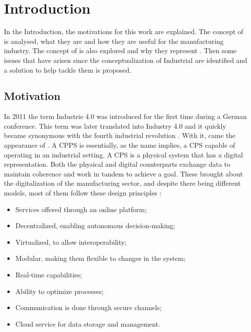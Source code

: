 


\chapter{Introduction}
\label{cha:introduction}

In the Introduction, the motivations for this work are explained. The concept of  is analysed, what they are and how they are useful for the manufacturing industry. The concept of  is also explored and why they represent . Then some issues that have arisen since the conceptualization of Industrial  are identified and a solution to help tackle them is proposed.

\section{Motivation}
\label{sec:motivation}

In 2011 the term Industrie 4.0 was introduced for the first time during a German conference. This term was later translated into Industry 4.0 and it quickly became synonymous with the fourth industrial revolution \cite{birgit01}. With it, came the appearance of . A \acrshort{CPPS} is essentially, as the name implies, a \acrfull{CPS} capable of operating in an industrial setting. A \acrshort{CPS} is a physical system that has a digital representation. Both the physical and digital counterparts exchange data to maintain coherence and work in tandem to achieve a goal. These  brought about the digitalization of the manufacturing sector, and despite there being different models, most of them follow these design principles \cite{birgit01}:

\begin{itemize}
	\itemsep0em
	\item Services offered through an online platform;
	\item Decentralized, enabling autonomous decision-making;
	\item Virtualized, to allow interoperability;
	\item Modular, making them flexible to changes in the system;
	\item Real-time capabilities;
	\item Ability to optimize processes;
	\item Communication is done through secure channels;
	\item Cloud service for data storage and management.
\end{itemize}

